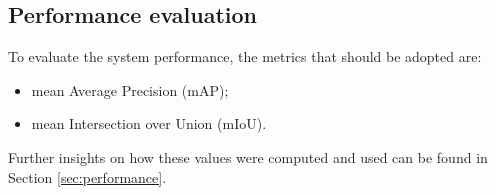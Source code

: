 



\subsection{Performance evaluation}
To evaluate the system performance, the metrics that should be adopted are:
\begin{itemize}
    \item mean Average Precision (mAP);
    \item mean Intersection over Union (mIoU).
\end{itemize}
\begin{flushleft}
Further insights on how these values were computed and used can be found in Section \ref{sec:performance}.
\end{flushleft}


